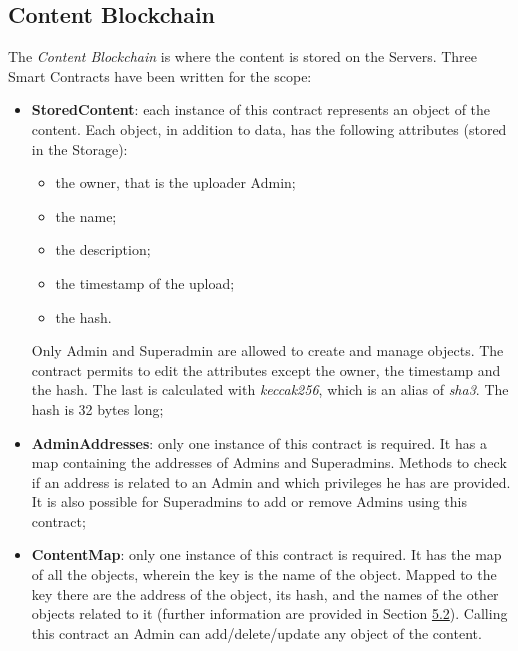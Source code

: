 \documentclass[hidelinks,conference,compsoc]{IEEEtran}
\begin{document}
\subsection{Content Blockchain}
The \textit{Content Blockchain} is where the content is stored on the Servers. Three Smart Contracts have been written for the scope:
\begin{itemize}
	\item \textbf{StoredContent}: each instance of this contract represents an object of the content. Each object, in addition to data, has the following attributes (stored in the Storage): 
	\begin{itemize}
		\item the owner, that is the uploader Admin;
		\item the name;
		\item the description;
		\item the timestamp of the upload;
		\item the hash.
	\end{itemize}
	Only Admin and Superadmin are allowed to create and manage objects. The contract permits to edit the attributes except the owner, the timestamp and the hash. The last is calculated with \textit{keccak256}, which is an alias of \textit{sha3}. The hash is 32 bytes long;
	\item \textbf{AdminAddresses}: only one instance of this contract is required. It has a map containing the addresses of Admins and Superadmins. Methods to check if an address is related to an Admin and which privileges he has are provided. It is also possible for Superadmins to add or remove Admins using this contract;
	\item \textbf{ContentMap}: only one instance of this contract is required. It has the map of all the objects, wherein the key is the name of the object. Mapped to the key there are the address of the object, its hash, and the names of the other objects related to it (further information are provided in Section \hyperref[sec:Clienthashes]{5.2}). Calling this contract an Admin can add/delete/update any object of the content.
	
\end{itemize}
\end{document}
